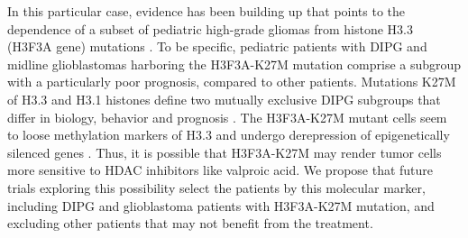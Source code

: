 In this particular case, evidence has been building up that points to the dependence of a subset of pediatric high-grade gliomas from histone H3.3 (H3F3A gene) mutations \cite{Wu_2012,Bender_2013,Venneti_2014,Solomon_2015}. To be specific, pediatric patients with DIPG and midline glioblastomas harboring the H3F3A-K27M mutation comprise a subgroup with a particularly poor prognosis, compared to other patients. Mutations K27M of H3.3 and H3.1 histones define two mutually exclusive DIPG subgroups that differ in biology, behavior and prognosis \cite{Castel_2015}. The H3F3A-K27M mutant cells seem to loose methylation markers of H3.3 and undergo derepression of epigenetically silenced genes \cite{Chan_2013}. Thus, it is possible that H3F3A-K27M may render tumor cells more sensitive to HDAC inhibitors like valproic acid. We propose that future trials exploring this possibility select the patients by this molecular marker, including DIPG and glioblastoma patients with H3F3A-K27M mutation, and excluding other patients that may not benefit from the treatment.